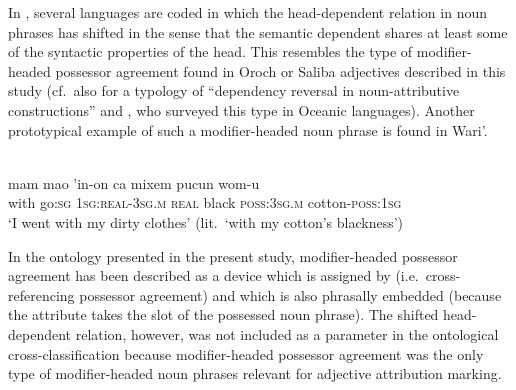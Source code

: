 In , several languages are coded in which the head-dependent relation in noun phrases has shifted in the sense that the semantic dependent shares at least some of the syntactic properties of the head. This resembles the type of modifier\hyp{}headed possessor agreement found in Oroch or Saliba adjectives described in this study (cf.~also \citealt{malchukov2000} for a typology of “dependency reversal in noun-attributive constructions” and \citealt{ross1998}, who surveyed this type in Oceanic languages). Another prototypical example of such a modifier\hyp{}headed noun phrase is found in Wari'.
\begin{exe}
\ex \label{ex1} \\
  \gll	mam mao 'in-on		ca	    mixem  pucun	wom-u\\
  	with  go:\textsc{sg}  \textsc{1sg:real-3sg.m}	\textsc{real}  black    \textsc{poss:3sg.m}	cotton-\textsc{poss:1sg}\\
  \glt ‘I went with my dirty clothes’ (lit.~‘with my cotton's blackness’)
\end{exe}
In the ontology presented in the present study, modifier\hyp{}headed possessor agreement has been described as a device which is assigned by  (i.e.~cross-referencing possessor agreement) and which is also phrasally embedded (because the attribute takes the slot of the possessed noun phrase). The shifted head-dependent relation, however, was not included as a parameter in the ontological cross-classification because modifier\hyp{}headed possessor agreement was the only type of modifier\hyp{}headed noun phrases relevant for adjective attribution marking.

